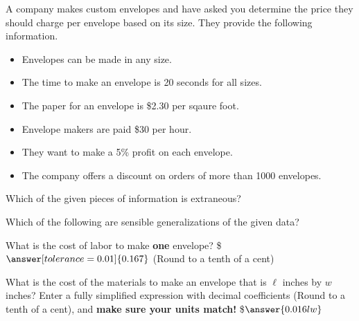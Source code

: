 \documentclass{ximera}
\begin{document}
\begin{problem}
    A company makes custom envelopes and have asked you determine the price they should charge per envelope based on its size.  They provide the following information.
    \begin{itemize}
        \item Envelopes can be made in any size.
        \item The time to make an envelope is 20 seconds for all sizes.
        \item The paper for an envelope is \$2.30 per sqaure foot.
        \item Envelope makers are paid \$30 per hour.
        \item They want to make a 5\% profit on each envelope.
        \item The company offers a discount on orders of more than 1000 envelopes.
    \end{itemize}
    Which of the given pieces of information is extraneous?
    \begin{multipleChoice}
    \end{multipleChoice}

    \begin{problem}
        Which of the following are sensible generalizations of the given data?
        \begin{selectAll}
        \end{selectAll}

        \begin{problem}
            What is the cost of labor to make \textbf{one} envelope? \$$\answer[tolerance=0.01]{0.167}$ (Round to a tenth of a cent)
        \end{problem}

        \begin{problem}
            What is the cost of the materials to make an envelope that is $\ell$ inches by $w$ inches? Enter a fully simplified expression with decimal coefficients (Round to a tenth of a cent), and \textbf{make sure your units match!} \$$\answer{0.016lw}$ 


\end{problem}
\end{problem}
\end{problem}
\end{document}
